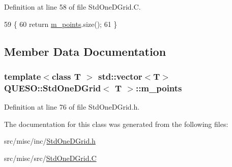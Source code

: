 Definition at line 58 of file Std\-One\-D\-Grid.\-C.


\begin{DoxyCode}
59 \{
60   \textcolor{keywordflow}{return} \hyperlink{class_q_u_e_s_o_1_1_std_one_d_grid_ab6b505e5ffa0e77dfd0928f8d99155bd}{m\_points}.size();
61 \}
\end{DoxyCode}


\subsection{Member Data Documentation}
\hypertarget{class_q_u_e_s_o_1_1_std_one_d_grid_ab6b505e5ffa0e77dfd0928f8d99155bd}{
\subsubsection[{m\-\_\-points}]{\setlength{\rightskip}{0pt plus 5cm}template$<$class T $>$ std\-::vector$<$T$>$ {\bf Q\-U\-E\-S\-O\-::\-Std\-One\-D\-Grid}$<$ T $>$\-::m\-\_\-points\hspace{0.3cm}{\ttfamily [protected]}}}\label{class_q_u_e_s_o_1_1_std_one_d_grid_ab6b505e5ffa0e77dfd0928f8d99155bd}


Definition at line 76 of file Std\-One\-D\-Grid.\-h.



The documentation for this class was generated from the following files\-:\begin{DoxyCompactItemize}
\item 
src/misc/inc/\hyperlink{_std_one_d_grid_8h}{Std\-One\-D\-Grid.\-h}\item 
src/misc/src/\hyperlink{_std_one_d_grid_8_c}{Std\-One\-D\-Grid.\-C}\end{DoxyCompactItemize}
